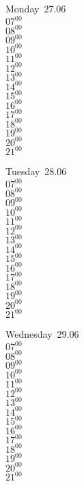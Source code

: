 \documentclass[11pt,a4paper]{book}\usepackage[]{graphicx}\usepackage[]{color}
\begin{document}
\begin{headerbox}
\end{headerbox}
\begin{weekdaybox}
  Monday~27.06\\
  { 
  \vfill
  $07^{00}$\\
$08^{00}$\\
$09^{00}$\\
$10^{00}$\\
$11^{00}$\\
$12^{00}$\\
$13^{00}$\\
$14^{00}$\\
$15^{00}$\\
$16^{00}$\\
$17^{00}$\\
$18^{00}$\\
$19^{00}$\\
$20^{00}$\\
$21^{00}$\\
  }
\end{weekdaybox}
\begin{weekdaybox}
  Tuesday~28.06\\
  { 
  \vfill
  $07^{00}$\\
$08^{00}$\\
$09^{00}$\\
$10^{00}$\\
$11^{00}$\\
$12^{00}$\\
$13^{00}$\\
$14^{00}$\\
$15^{00}$\\
$16^{00}$\\
$17^{00}$\\
$18^{00}$\\
$19^{00}$\\
$20^{00}$\\
$21^{00}$\\
  }
\end{weekdaybox}
\begin{weekdaybox}
  Wednesday~29.06\\
  { 
  \vfill
  $07^{00}$\\
$08^{00}$\\
$09^{00}$\\
$10^{00}$\\
$11^{00}$\\
$12^{00}$\\
$13^{00}$\\
$14^{00}$\\
$15^{00}$\\
$16^{00}$\\
$17^{00}$\\
$18^{00}$\\
$19^{00}$\\
$20^{00}$\\
$21^{00}$\\
  }
\end{weekdaybox}
\end{document}
